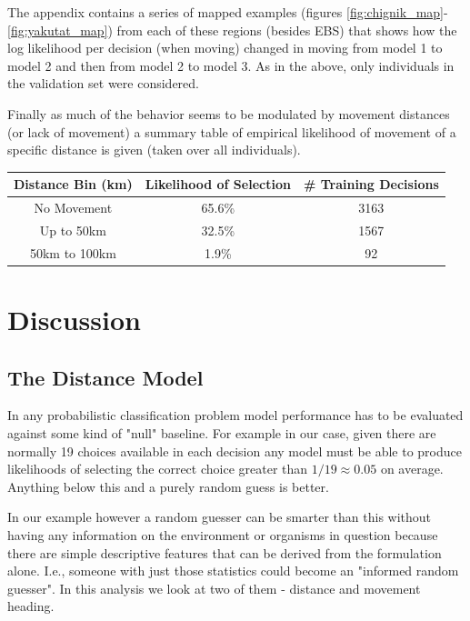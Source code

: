\documentclass[11pt]{article}
\begin{document}
The appendix contains a series of mapped examples (figures \ref{fig:chignik_map}-\ref{fig:yakutat_map}) from each of these regions (besides EBS) that shows how the log likelihood per decision (when moving) changed in moving from model 1 to model 2 and then from model 2 to model 3. As in the above, only individuals in the validation set were considered.\newline

Finally as much of the behavior seems to be modulated by movement distances (or lack of movement) a summary table of empirical likelihood of movement of a specific distance is given (taken over all individuals). 

\begin{center}
\begin{tabular}{| c | c | c |}
\hline
Distance Bin (km) & Likelihood of Selection & \# Training Decisions \\
\hline
No Movement & 65.6\% & 3163 \\
Up to 50km & 32.5\% & 1567 \\
50km to 100km & 1.9\% & 92 \\
\hline

\end{tabular}
\end{center}


\section*{Discussion}

\subsection*{The Distance Model}


In any probabilistic classification problem model performance has to be evaluated against some kind of "null" baseline. For example in our case, given there are normally 19 choices available in each decision any model must be able to produce likelihoods of selecting the correct choice greater than $1/19\approx 0.05$ on average. Anything below this and a purely random guess is better. 

In our example however a random guesser can be smarter than this without having any information on the environment or organisms in question because there are simple descriptive features that can be derived from the formulation alone. I.e., someone with just those statistics could become an "informed random guesser". In this analysis we look at two of them - distance and movement heading. 
\end{document}
